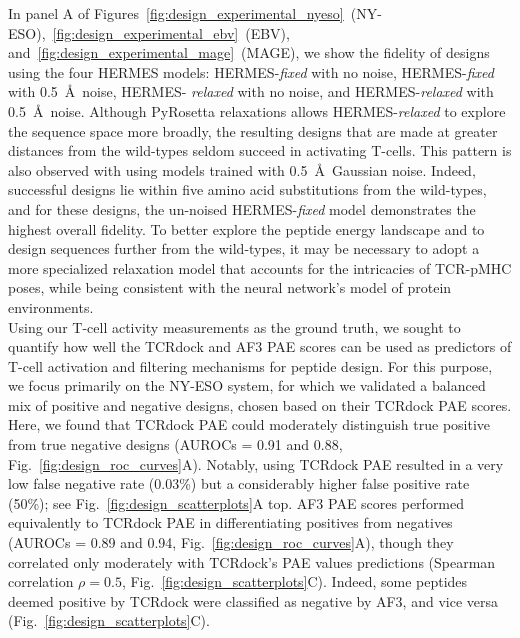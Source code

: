  In panel A of
Figures~\ref{fig:design_experimental_nyeso}~(NY-ESO),~\ref{fig:design_experimental_ebv}~(EBV),
and~\ref{fig:design_experimental_mage}~(MAGE), we show the fidelity of designs using the four HERMES
models: HERMES-{\em fixed} with no noise, HERMES-{\em fixed} with 0.5~\AA~noise, HERMES-{\em
relaxed} with no noise, and HERMES-{\em relaxed} with 0.5~\AA~noise. Although PyRosetta relaxations
allows HERMES-{\em relaxed} to explore the sequence space more broadly, the resulting designs that
are made at greater distances from the wild-types seldom succeed in activating T-cells. This pattern
is also observed with using models trained with 0.5~\AA~Gaussian noise. Indeed, successful designs
lie within five amino acid substitutions from the wild-types, and for these designs, the un-noised
HERMES-{\em fixed} model demonstrates the highest overall fidelity. To better explore the peptide
energy landscape and to design sequences further from the wild-types, it may be necessary to adopt a
more specialized relaxation model that accounts for the intricacies of TCR-pMHC poses, while being
consistent with the neural network's model of protein environments.\\

 Using our T-cell activity measurements
as the ground truth, we sought to quantify how well the TCRdock and AF3 PAE scores can be used as
predictors of T-cell activation and filtering mechanisms for peptide design. For this purpose, we
focus primarily on the NY-ESO system, for which we validated a balanced mix of positive and negative
designs, chosen based on their TCRdock PAE scores. Here, we found that TCRdock PAE could moderately
distinguish true positive from true negative designs (AUROCs = 0.91 and 0.88,
Fig.~\ref{fig:design_roc_curves}A). Notably, using TCRdock PAE resulted in a very low false negative
rate (0.03\%) but a considerably higher false positive rate (50\%); see
Fig.~\ref{fig:design_scatterplots}A top. AF3 PAE scores performed equivalently to TCRdock PAE in
differentiating positives from negatives (AUROCs = 0.89 and 0.94,
Fig.~\ref{fig:design_roc_curves}A), though they correlated only moderately with TCRdock’s PAE values
predictions (Spearman correlation $\rho=0.5$, Fig.~\ref{fig:design_scatterplots}C). Indeed, some
peptides deemed positive by TCRdock were classified as negative by AF3, and vice versa
(Fig.~\ref{fig:design_scatterplots}C).

